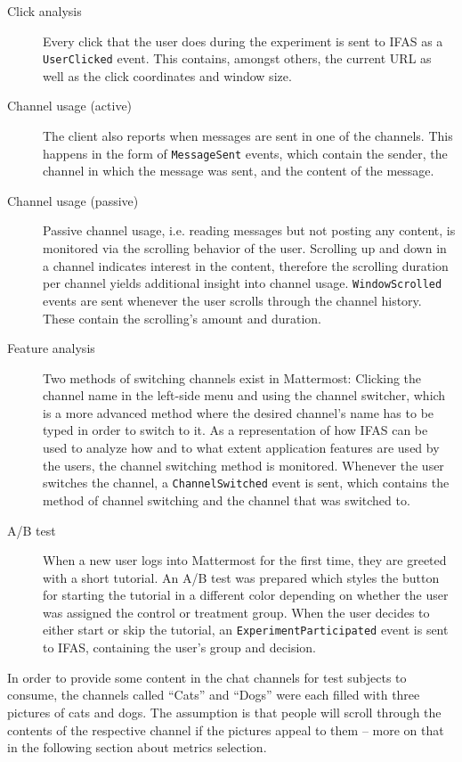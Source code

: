\begin{description}
\label{list:cases}
\item[Click analysis]
Every click that the user does during the experiment is sent to \ac{IFAS} as a \texttt{UserClicked} event.
This contains, amongst others, the current URL as well as the click coordinates and window size.
\item[Channel usage (active)]
The client also reports when messages are sent in one of the channels.
This happens in the form of \texttt{MessageSent} events, which contain the sender, the channel in which the message was sent, and the content of the message.
\item[Channel usage (passive)]
Passive channel usage, i.e. reading messages but not posting any content, is monitored via the scrolling behavior of the user.
Scrolling up and down in a channel indicates interest in the content, therefore the scrolling duration per channel yields additional insight into channel usage.
\texttt{WindowScrolled} events are sent whenever the user scrolls through the channel history.
These contain the scrolling's amount and duration.
\item[Feature analysis]
Two methods of switching channels exist in Mattermost: Clicking the channel name in the left-side menu and using the channel switcher, which is a more advanced method where the desired channel's name has to be typed in order to switch to it.
As a representation of how \ac{IFAS} can be used to analyze how and to what extent application features are used by the users, the channel switching method is monitored.
Whenever the user switches the channel, a \texttt{ChannelSwitched} event is sent, which contains the method of channel switching and the channel that was switched to.
\item[A/B test]
When a new user logs into Mattermost for the first time, they are greeted with a short tutorial.
An A/B test was prepared which styles the button for starting the tutorial in a different color depending on whether the user was assigned the control or treatment group.
When the user decides to either start or skip the tutorial, an \texttt{ExperimentParticipated} event is sent to \ac{IFAS}, containing the user's group and decision.

\end{description}

In order to provide some content in the chat channels for test subjects to consume, the channels called ``Cats'' and ``Dogs'' were each filled with three pictures of cats and dogs.
The assumption is that people will scroll through the contents of the respective channel if the pictures appeal to them -- more on that in the following section about metrics selection.

